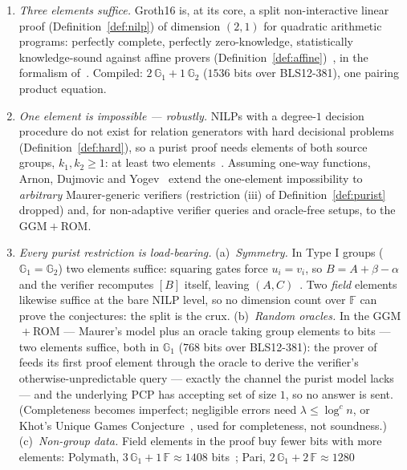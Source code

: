 \documentclass{conjura-conjecture}
\newcommand{\Gone}{\mathbb{G}_1}
\newcommand{\Gtwo}{\mathbb{G}_2}
\newcommand{\FF}{\mathbb{F}}
\begin{document}
\begin{enumerate}[label=(F\arabic*),ref=F\arabic*,leftmargin=*,itemsep=1pt,topsep=2pt]
\item\label{F1} \emph{Three elements suffice.}  Groth16 is, at its
  core, a split non-interactive linear proof
  (Definition~\ref{def:nilp}) of dimension $(2,1)$ for quadratic
  arithmetic programs: perfectly complete, perfectly zero-knowledge,
  statistically knowledge-sound against affine provers
  (Definition~\ref{def:affine})~\cite{Gro16}, in the formalism
  of~\cite{BCIOP13}.  Compiled: $2\,\Gone + 1\,\Gtwo$ ($1536$ bits
  over BLS12-381), one pairing product equation.
\item\label{F2} \emph{One element is impossible --- robustly.}  NILPs
  with a degree-$1$ decision procedure do not exist for relation
  generators with hard decisional problems
  (Definition~\ref{def:hard}), so a purist proof needs elements of
  both source groups, $k_1,k_2 \geq 1$: at least two
  elements~\cite[Thms.~3--4]{Gro16}.  Assuming one-way functions,
  Arnon, Dujmovic and Yogev~\cite{ADY25} extend the one-element
  impossibility to \emph{arbitrary} Maurer-generic verifiers
  (restriction (iii) of Definition~\ref{def:purist} dropped) and,
  for non-adaptive verifier queries and oracle-free setups, to the
  GGM${}+{}$ROM.
\item\label{F3} \emph{Every purist restriction is load-bearing.}
  (a)~\emph{Symmetry.}  In Type I groups ($\Gone = \Gtwo$) two
  elements suffice: squaring gates force $u_i = v_i$, so
  $B = A + \beta - \alpha$ and the verifier recomputes $[B]$ itself,
  leaving $(A,C)$~\cite[Sect.~3.1]{Gro16}.  Two \emph{field} elements
  likewise suffice at the bare NILP level, so no dimension count
  over $\FF$ can prove the conjectures: the split is the crux.
  (b)~\emph{Random oracles.}  In the GGM${}+{}$ROM --- Maurer's
  model plus an oracle taking group elements to bits --- two
  elements suffice, both in $\Gone$ ($768$ bits over BLS12-381): the
  prover of~\cite{ADY25} feeds its first proof element through the
  oracle to derive the verifier's otherwise-unpredictable query ---
  exactly the channel the purist model lacks --- and the underlying
  PCP has accepting set of size $1$, so no answer is sent.
  (Completeness becomes imperfect; negligible errors need
  $\lambda \leq \log^c n$, or Khot's Unique Games
  Conjecture~\cite{Kho02}, used for completeness, not soundness.)
  (c)~\emph{Non-group data.}  Field elements in the proof buy fewer
  bits with more elements: Polymath, $3\,\Gone + 1\,\FF \approx 1408$
  bits~\cite{Lip24}; Pari, $2\,\Gone + 2\,\FF \approx 1280$

\end{enumerate}
\end{document}
